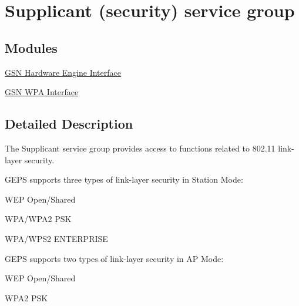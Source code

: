 \hypertarget{a00683}{
\section{Supplicant (security) service group}
\label{a00683}
}
\subsection*{Modules}
\begin{DoxyCompactItemize}
\item 
\hyperlink{a00686}{GSN Hardware Engine Interface}
\item 
\hyperlink{a00687}{GSN WPA Interface}
\end{DoxyCompactItemize}


\subsection{Detailed Description}
The Supplicant service group provides access to functions related to 802.11 link-\/layer security.

GEPS supports three types of link-\/layer security in Station Mode:
\begin{DoxyItemize}
\item WEP Open/Shared
\item WPA/WPA2 PSK
\item WPA/WPS2 ENTERPRISE
\end{DoxyItemize}

GEPS supports two types of link-\/layer security in AP Mode:
\begin{DoxyItemize}
\item WEP Open/Shared
\item WPA2 PSK 
\end{DoxyItemize}